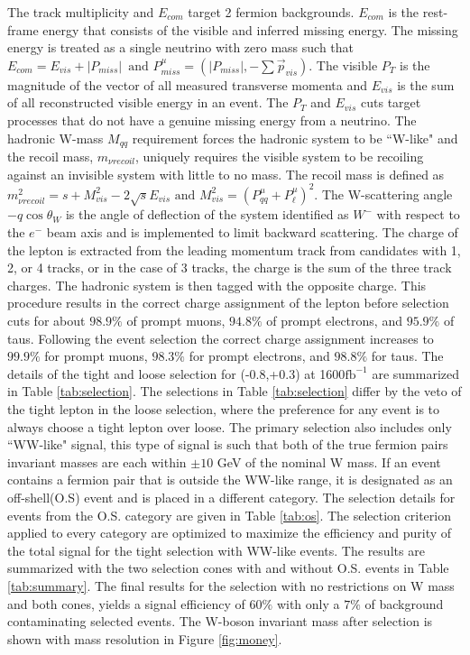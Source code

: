 The track multiplicity and $E_{com}$ target 2 fermion backgrounds. $E_{com}$ is the rest-frame energy that consists of the visible and inferred missing energy. The missing energy is treated as a single neutrino with zero mass such that $E_{com} = E_{vis} + |P_{miss}| \, \,  \, \text{and} \, \, P^\mu_{miss} = (|P_{miss}| , -\sum{\vec{p}_{vis}})$. The visible $P_T$ is the magnitude of the vector of all measured transverse momenta and $E_{vis}$ is the sum of all reconstructed visible energy in an event. The $P_T$ and $E_{vis}$ cuts target processes that do not have a genuine missing energy from a neutrino. The hadronic W-mass $M_{qq}$ requirement forces the hadronic system to be ``W-like" and the recoil mass, $m_{\nu recoil}$, uniquely requires the visible system to be recoiling against an invisible system with little to no mass. The recoil mass is defined as $m^2_{\nu recoil} = s + M^2_{vis} - 2\sqrt{s}E_{vis} \, \, \text{and} \, \, M^2_{vis} = ( P^{\mu}_{qq} +  P^{\mu}_{\ell})^2$. The W-scattering angle $-q\cos\theta_W$ is the angle of deflection of the system identified as $W^-$ with respect to the $e^-$ beam axis and is implemented to limit backward scattering.  The charge of the lepton is extracted from the leading momentum track from candidates with 1, 2, or 4 tracks, or in the case of 3 tracks, the charge is the sum of the three track charges. The hadronic system is then tagged with the opposite charge.  This procedure results in the correct charge assignment of the lepton before selection cuts for about $98.9\%$ of prompt muons, $94.8\%$ of prompt electrons, and $95.9\%$ of taus. Following the event selection the correct charge assignment increases to $99.9\%$ for prompt muons, $98.3\%$ for prompt electrons, and $98.8\%$ for taus. The details of the tight and loose selection for (-0.8,+0.3) at 1600$\text{fb}^{-1}$ are summarized in Table \ref{tab:selection}. The selections in Table \ref{tab:selection} differ by the veto of the tight lepton in the loose selection, where the preference for any event is to always choose a tight lepton over loose. The primary selection also includes only ``WW-like" signal, this type of signal is such that both of the true fermion pairs invariant masses are each within $\pm10$ GeV of the nominal W mass. If an event contains a fermion pair that is outside the WW-like range, it is designated as an off-shell(O.S) event and is placed in a different category. The selection details for events from the O.S. category are given in Table \ref{tab:os}. The selection criterion applied to every category are optimized to maximize the efficiency and purity of the total signal for the tight selection with WW-like events. The results are summarized with the two selection cones with and without O.S. events in Table \ref{tab:summary}. The final results for the selection with no restrictions on W mass and both cones, yields a signal efficiency of $60\%$ with only a $7\%$ of background contaminating selected events. The W-boson invariant mass after selection is shown with mass resolution in Figure \ref{fig:money}.


